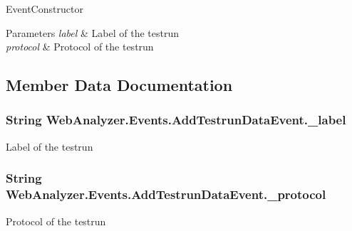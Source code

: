 Event\+Constructor 


\begin{DoxyParams}{Parameters}
{\em label} & Label of the testrun\\
\hline
{\em protocol} & Protocol of the testrun\\
\hline
\end{DoxyParams}


\subsection{Member Data Documentation}
\hypertarget{class_web_analyzer_1_1_events_1_1_add_testrun_data_event_a9d17f924b52596182aca3ea492b590d4}{}
\subsubsection[{\+\_\+label}]{\setlength{\rightskip}{0pt plus 5cm}String Web\+Analyzer.\+Events.\+Add\+Testrun\+Data\+Event.\+\_\+label\hspace{0.3cm}{\ttfamily [private]}}\label{class_web_analyzer_1_1_events_1_1_add_testrun_data_event_a9d17f924b52596182aca3ea492b590d4}


Label of the testrun 

\hypertarget{class_web_analyzer_1_1_events_1_1_add_testrun_data_event_aeb05943e77268d71ccbb2807685989d2}{}
\subsubsection[{\+\_\+protocol}]{\setlength{\rightskip}{0pt plus 5cm}String Web\+Analyzer.\+Events.\+Add\+Testrun\+Data\+Event.\+\_\+protocol\hspace{0.3cm}{\ttfamily [private]}}\label{class_web_analyzer_1_1_events_1_1_add_testrun_data_event_aeb05943e77268d71ccbb2807685989d2}


Protocol of the testrun 



